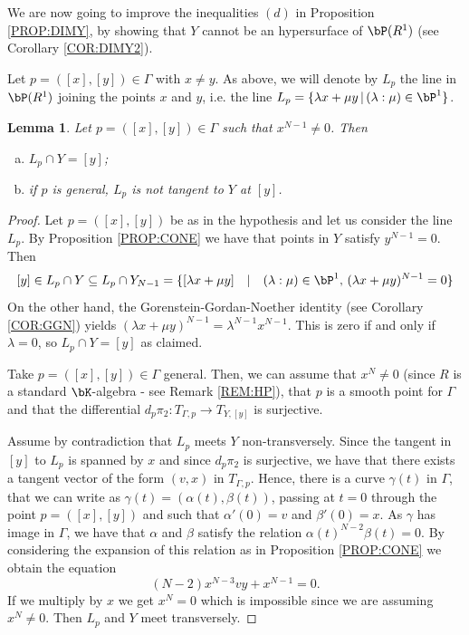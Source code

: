 \documentclass[a4paper,11pt]{amsart}
\newtheorem{lemma}[theorem]{Lemma}
\begin{document}

We are now going to improve the inequalities $(d)$ in Proposition \ref{PROP:DIMY}, by showing that $Y$ cannot be an hypersurface of $\bP(R^1)$ (see Corollary \ref{COR:DIMY2}). 
\vspace{2mm}

Let $p=([x],[y])\in \Gamma$ with $x\neq y$. As above, we will denote by $L_p$ the line in $\bP(R^1)$ joining the points $x$ and $y$, i.e. the line 
$L_p=\{\lambda x+\mu y\,|\, (\lambda:\mu)\in \bP^1\}$.

\begin{lemma} 
\label{LEM:LINE}
Let $p=([x],[y])\in \Gamma$ such that $x^{N-1}\neq 0$. Then
\begin{enumerate}[(a)]
\item $L_p\cap Y=[y]$;
\item if $p$ is general, $L_p$ is not tangent to $Y$ at $[y]$.
\end{enumerate}
\end{lemma}

\begin{proof}
Let $p=([x],[y])$ be as in the hypothesis and let us consider the line $L_p$. By Proposition \ref{PROP:CONE} we have that points in $Y$ satisfy $y^{N-1}=0$. Then
$$[y]\in L_p\cap Y \subseteq L_p\cap Y_{N-1}=\{[\lambda x+\mu y]\quad|\quad (\lambda:\mu)\in \bP^1,\, (\lambda x+\mu y)^{N-1}=0\}$$
On the other hand, the Gorenstein-Gordan-Noether identity (see Corollary \ref{COR:GGN}) yields $(\lambda x+\mu y)^{N-1}=\lambda^{N-1}x^{N-1}$. This is zero if and only if $\lambda=0$, so $L_p\cap Y=[y]$ as claimed.
\vspace{2mm}

Take $p=([x],[y])\in \Gamma$ general. Then, we can assume that $x^N\neq 0$ (since $R$ is a standard $\bK$-algebra - see Remark \ref{REM:HP}), that $p$ is a smooth point for $\Gamma$ and that the differential $d_p\pi_2:T_{\Gamma,p}\to T_{Y,[y]}$ is surjective.
\vspace{2mm}

Assume by contradiction that $L_p$ meets $Y$ non-transversely. Since the tangent in $[y]$ to $L_p$ is spanned by $x$ and since $d_p\pi_2$ is surjective, we have that there exists a tangent vector of the form $(v,x)$ in $T_{\Gamma,p}$. 
Hence, there is a curve $\gamma(t)$ in $\Gamma$, that we can write as $\gamma(t)=(\alpha(t),\beta(t))$, passing at $t=0$ through the point $p=([x],[y])$ and such that $\alpha'(0)=v$ and $\beta'(0)=x$.
As $\gamma$ has image in $\Gamma$, we have that $\alpha$ and $\beta$ satisfy the relation $\alpha(t)^{N-2}\beta(t)=0$. By considering the expansion of this relation as in Proposition \ref{PROP:CONE} we obtain the equation
$$(N-2)x^{N-3}vy+x^{N-1}=0.$$
If we multiply by $x$ we get $x^{N}=0$ which is impossible since we are assuming $x^N\neq 0$. Then $L_p$ and $Y$ meet transversely.
\end{proof}
\end{document}
